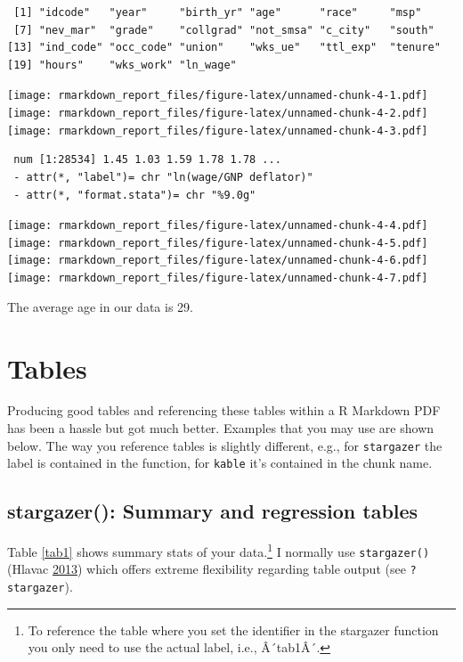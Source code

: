 \documentclass[
  12pt,
]{article}
\begin{document}
\begin{verbatim}
 [1] "idcode"   "year"     "birth_yr" "age"      "race"     "msp"     
 [7] "nev_mar"  "grade"    "collgrad" "not_smsa" "c_city"   "south"   
[13] "ind_code" "occ_code" "union"    "wks_ue"   "ttl_exp"  "tenure"  
[19] "hours"    "wks_work" "ln_wage" 
\end{verbatim}

\texttt{[image: rmarkdown\_report\_files/figure-latex/unnamed-chunk-4-1.pdf]} \texttt{[image: rmarkdown\_report\_files/figure-latex/unnamed-chunk-4-2.pdf]} \texttt{[image: rmarkdown\_report\_files/figure-latex/unnamed-chunk-4-3.pdf]}

\begin{verbatim}
 num [1:28534] 1.45 1.03 1.59 1.78 1.78 ...
 - attr(*, "label")= chr "ln(wage/GNP deflator)"
 - attr(*, "format.stata")= chr "%9.0g"
\end{verbatim}

\texttt{[image: rmarkdown\_report\_files/figure-latex/unnamed-chunk-4-4.pdf]} \texttt{[image: rmarkdown\_report\_files/figure-latex/unnamed-chunk-4-5.pdf]} \texttt{[image: rmarkdown\_report\_files/figure-latex/unnamed-chunk-4-6.pdf]} \texttt{[image: rmarkdown\_report\_files/figure-latex/unnamed-chunk-4-7.pdf]}

The average age in our data is 29.

\hypertarget{sec:tables}{%
\section{Tables}\label{sec:tables}}

Producing good tables and referencing these tables within a R Markdown PDF has been a hassle but got much better. Examples that you may use are shown below. The way you reference tables is slightly different, e.g., for \texttt{stargazer} the label is contained in the function, for \texttt{kable} it's contained in the chunk name.

\hypertarget{stargazer-summary-and-regression-tables}{%
\subsection{stargazer(): Summary and regression tables}\label{stargazer-summary-and-regression-tables}}

Table \ref{tab1} shows summary stats of your data.\footnote{To reference the table where you set the identifier in the stargazer function you only need to use the actual label, i.e., Â´tab1Â´.} I normally use \texttt{stargazer()} (Hlavac \protect\hyperlink{ref-hlavac2013stargazer}{2013}) which offers extreme flexibility regarding table output (see \texttt{?stargazer}).
\end{document}
